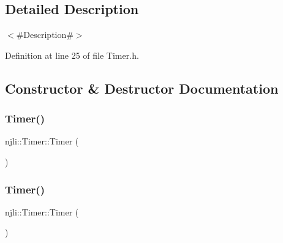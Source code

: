 \subsection{Detailed Description}
$<$\#\+Description\#$>$ 

Definition at line 25 of file Timer.\+h.



\subsection{Constructor \& Destructor Documentation}
\mbox{\label{classnjli_1_1_timer_afcd00947fc6d6c3a3a956ed57b4cd18b}} 
\subsubsection{\texorpdfstring{Timer()}{Timer()}\hspace{0.1cm}{\footnotesize\ttfamily [1/3]}}
{\footnotesize\ttfamily njli\+::\+Timer\+::\+Timer (\begin{DoxyParamCaption}{ }\end{DoxyParamCaption})\hspace{0.3cm}{\ttfamily [protected]}}

\mbox{\label{classnjli_1_1_timer_a3cc6b1b2968ae74823383e0cd84c5d78}} 
\subsubsection{\texorpdfstring{Timer()}{Timer()}\hspace{0.1cm}{\footnotesize\ttfamily [2/3]}}
{\footnotesize\ttfamily njli\+::\+Timer\+::\+Timer (\begin{DoxyParamCaption}\item[{const \mbox{\hyperlink{classnjli_1_1_abstract_builder}{Abstract\+Builder}} \&}]{ }\end{DoxyParamCaption})\hspace{0.3cm}{\ttfamily [protected]}}

\mbox{\label{classnjli_1_1_timer_a9cfd12bef5e562a48bc5e5ca033c6a7c}} 
